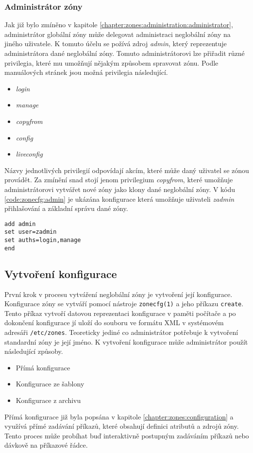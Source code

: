 \subsubsection{Administrátor zóny}
\label{chapter:zones:configuration:resources:admin}
Jak již bylo zmíněno v kapitole \ref{chapter:zones:administration:administrator}, administrátor globální zóny může delegovat 
administraci neglobální zóny na jiného uživatele. K tomuto účelu se požívá zdroj \textit{admin}, který reprezentuje administrátora
dané neglobální zóny. Tomuto administrátorovi lze přiřadit různé privilegia, které mu umožňují nějakým způsobem spravovat zónu.
Podle manuálových stránek \cite{oracle:manpages:zonecfg} jsou možná privilegia následující.
\begin{itemize}
 \item \textit{login}
 \item \textit{manage}
 \item \textit{copyfrom}
 \item \textit{config}
 \item \textit{liveconfig}
\end{itemize}
Názvy jednotlivých privilegií odpovídají akcím, které může daný uživatel se zónou provádět. Za zmínění snad stojí jenom 
privilegium \textit{copyfrom}, které umožňuje administrátorovi vytvářet nové zóny jako klony dané neglobální zóny. V kódu
\ref{code:zonecfg:admin} je ukázána konfigurace která umožňuje uživateli \textit{zadmin} přihlašování a základní správu dané
zóny.
\begin{lstlisting}[caption={Delegace administrace jinému uživateli}, float, label={code:zonecfg:admin}]
add admin
set user=zadmin
set auths=login,manage
end
\end{lstlisting}
\subsection{Vytvoření konfigurace}
\label{chapter:zones:configuration:creating}
První krok v procesu vytváření neglobální zóny je vytvoření její konfigurace. Konfigurace zóny se vytváří pomocí nástroje 
\verb|zonecfg(1)| a jeho příkazu \verb|create|. Tento příkaz vytvoří datovou reprezentaci konfigurace v paměti počítače a
po dokončení konfigurace jí uloží do souboru ve formátu XML v systémovém adresáři \verb|/etc/zones|. Teoreticky jediné co
administrátor potřebuje k vytvoření standardní zóny je její jméno. K vytvoření konfigurace může administrátor použít
následující způsoby.
\begin{itemize}
 \item Přímá konfigurace
 \item Konfigurace ze šablony
 \item Konfigurace z archivu
\end{itemize}
Přímá konfigurace již byla popsána v kapitole \ref{chapter:zones:configuration} a využívá přímé zadávání příkazů, které obsahují
definici atributů a zdrojů zóny. Tento proces může probíhat buď interaktivně postupným zadáváním příkazů nebo dávkově na
příkazové řádce.

